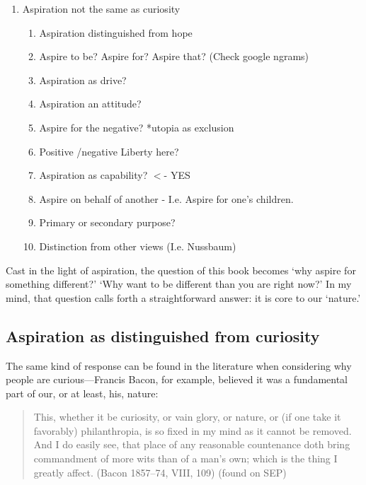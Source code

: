 \begin{enumerate}
\item Aspiration not the same as curiosity

\begin{enumerate}
\item Aspiration distinguished from hope

\item Aspire to be? Aspire for? Aspire that? (Check google ngrams)

\item Aspiration as drive?

\item Aspiration an attitude?

\item Aspire for the negative? *utopia as exclusion

\item Positive \slash  negative Liberty here?

\item Aspiration as capability? $<$- YES

\item Aspire on behalf of another - I.e. Aspire for one's children.

\item Primary or secondary purpose?

\item Distinction from other views (I.e. Nussbaum)

\end{enumerate}

\end{enumerate}

Cast in the light of aspiration, the question of this book becomes `why aspire for something different?' `Why want to be different than you are right now?' In my mind, that question calls forth a straightforward answer: it is core to our `nature.'

\subsection{Aspiration as distinguished from curiosity}
\label{aspirationasdistinguishedfromcuriosity}

The same kind of response can be found in the literature when considering why people are curious---Francis Bacon, for example, believed it was a fundamental part of our, or at least, his, nature:

\begin{quote}

This, whether it be curiosity, or vain glory, or nature, or (if one take it favorably) philanthropia, is so fixed in my mind as it cannot be removed. And I do easily see, that place of any reasonable countenance doth bring commandment of more wits than of a man's own; which is the thing I greatly affect. (Bacon 1857–74, VIII, 109) (found on SEP)
\end{quote}

